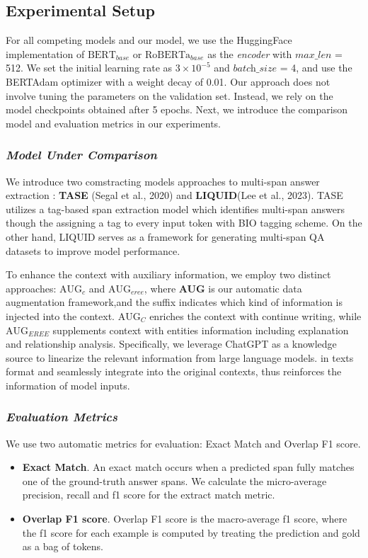 \documentclass[mathematics,article,submit,moreauthors]{Definitions/mdpi}
\newcommand{\1}[1]{\mathds{1}\left[#1\right]}
\begin{document}
\subsection{Experimental Setup}
	For all competing models and our model, we use the HuggingFace implementation of $\text{BERT}_{base}$ or $\text{RoBERTa}_{base}$ as the \textit{encoder} with $\textit{max\_len}$ = 512. We set the initial learning rate as $3 \times 10^{-5}$ and  $\textit{batch\_size}$ = 4, and use the BERTAdam optimizer with a weight decay of 0.01. Our approach does not involve tuning the parameters on the validation set. Instead, we rely on the model checkpoints obtained after 5 epochs. Next, we introduce the comparison model and evaluation metrics in our experiments.
	
	\subsubsection{\textit{Model Under Comparison}}
	\label{sec:baselines}
	We introduce two comstracting models approaches to multi-span answer extraction : \textbf{TASE} (Segal et al., 2020) and \textbf{LIQUID}(Lee et al., 2023). TASE utilizes a tag-based span extraction model which identifies multi-span answers though the assigning a tag to every input token with BIO tagging scheme. On the other hand, LIQUID serves as a framework for generating multi-span QA datasets to improve model performance.
	
	To enhance the context with auxiliary information, we employ two distinct   approaches: \textbf{$\text{AUG}_{c}$} and \textbf{$\text{AUG}_{eree}$}, where \textbf{AUG} is our automatic data augmentation framework,and the suffix indicates which kind of information is injected into the context. \textbf{$\text{AUG}_{C}$} enriches the context with continue writing, while \textbf{$\text{AUG}_{EREE}$} supplements context with entities information including explanation and relationship analysis.
	Specifically, we leverage ChatGPT as a knowledge source to linearize the relevant information from large language models. in texts format and seamlessly integrate into the original contexts, thus reinforces the information of model inputs.

	
	\subsubsection{\textit{Evaluation Metrics}}
	\label{sec:metrics}
	We use two automatic metrics for evaluation: Exact Match and Overlap F1 score.
	\begin{itemize}
		\item \textbf{Exact Match}. An exact match occurs when a predicted span fully matches one of the ground-truth
		answer spans. We calculate the micro-average precision, recall and f1 score for the extract match
		metric.
		
		\item \textbf{Overlap F1 score}. Overlap F1 score is the macro-average f1 score, where the f1 score for each
		example is computed by treating the prediction and gold as a bag of tokens.
	\end{itemize}
\end{document}
